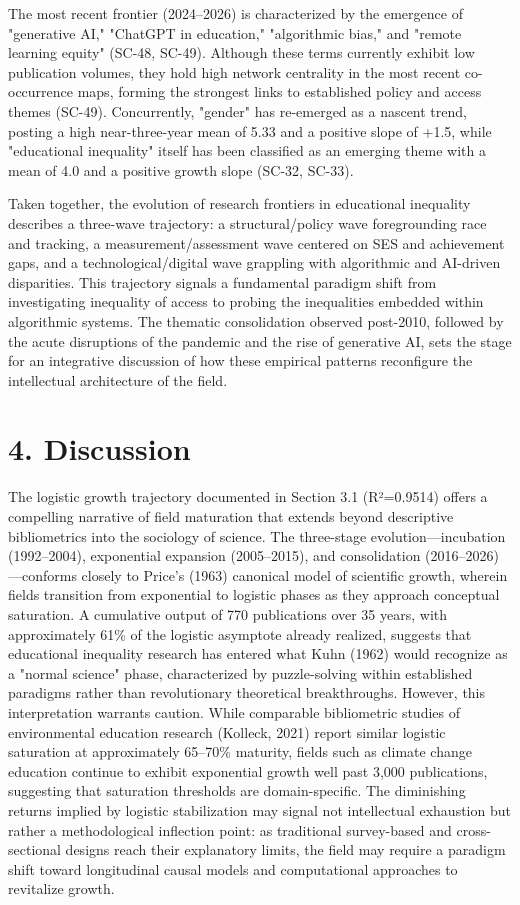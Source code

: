 \documentclass[12pt,a4paper]{article}
\begin{document}
The most recent frontier (2024–2026) is characterized by the emergence of "generative AI," "ChatGPT in education," "algorithmic bias," and "remote learning equity" (SC-48, SC-49). Although these terms currently exhibit low publication volumes, they hold high network centrality in the most recent co-occurrence maps, forming the strongest links to established policy and access themes (SC-49). Concurrently, "gender" has re-emerged as a nascent trend, posting a high near-three-year mean of 5.33 and a positive slope of +1.5, while "educational inequality" itself has been classified as an emerging theme with a mean of 4.0 and a positive growth slope (SC-32, SC-33).

Taken together, the evolution of research frontiers in educational inequality describes a three-wave trajectory: a structural/policy wave foregrounding race and tracking, a measurement/assessment wave centered on SES and achievement gaps, and a technological/digital wave grappling with algorithmic and AI-driven disparities. This trajectory signals a fundamental paradigm shift from investigating inequality of access to probing the inequalities embedded within algorithmic systems. The thematic consolidation observed post-2010, followed by the acute disruptions of the pandemic and the rise of generative AI, sets the stage for an integrative discussion of how these empirical patterns reconfigure the intellectual architecture of the field.

\section{4. Discussion}

The logistic growth trajectory documented in Section 3.1 (R²=0.9514) offers a compelling narrative of field maturation that extends beyond descriptive bibliometrics into the sociology of science. The three-stage evolution—incubation (1992–2004), exponential expansion (2005–2015), and consolidation (2016–2026)—conforms closely to Price's (1963) canonical model of scientific growth, wherein fields transition from exponential to logistic phases as they approach conceptual saturation. A cumulative output of 770 publications over 35 years, with approximately 61\% of the logistic asymptote already realized, suggests that educational inequality research has entered what Kuhn (1962) would recognize as a "normal science" phase, characterized by puzzle-solving within established paradigms rather than revolutionary theoretical breakthroughs. However, this interpretation warrants caution. While comparable bibliometric studies of environmental education research (Kolleck, 2021) report similar logistic saturation at approximately 65–70\% maturity, fields such as climate change education continue to exhibit exponential growth well past 3,000 publications, suggesting that saturation thresholds are domain-specific. The diminishing returns implied by logistic stabilization may signal not intellectual exhaustion but rather a methodological inflection point: as traditional survey-based and cross-sectional designs reach their explanatory limits, the field may require a paradigm shift toward longitudinal causal models and computational approaches to revitalize growth.
\end{document}

